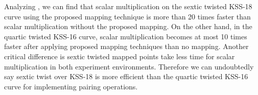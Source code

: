 \renewcommand{\arraystretch}{1.5}{
\begin{table}[ht]
\centering
\caption{ Comparative result of average execution time in [ms] for scalar multiplication.}
\label{table_opeationcomp_chap_ijnc2017}
\end{table}
}

Analyzing   , we can find that scalar multiplication on the sextic twisted KSS-18 curve using the proposed mapping technique is more than 20 times faster than scalar multiplication without the proposed mapping. 
On the other hand, in the quartic twisted KSS-16 curve, scalar multiplication becomes at most 10 times faster after applying proposed mapping techniques than no mapping. 
Another critical difference is sextic twisted mapped points take less time for scalar multiplication in both experiment environments. Therefore we can undoubtedly say sextic twist over KSS-18 is more efficient than the quartic twisted KSS-16 curve for implementing pairing operations.

